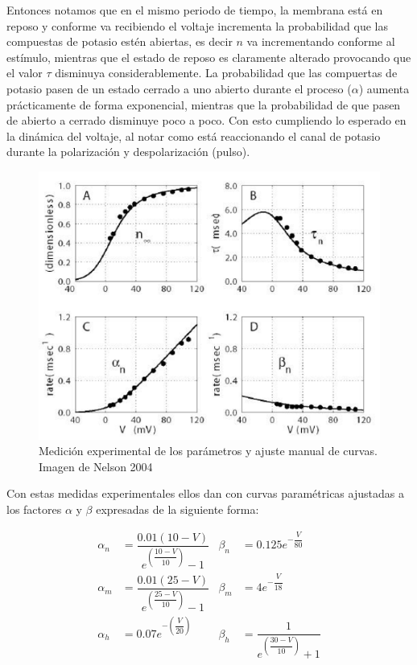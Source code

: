 Entonces notamos que en el mismo periodo de tiempo, la membrana está en reposo y conforme va recibiendo el voltaje incrementa la probabilidad que las compuestas de potasio estén abiertas, es decir \(n\) va incrementando conforme al estímulo, mientras que el estado de reposo es claramente alterado provocando que el valor \(\tau\) disminuya considerablemente. La probabilidad que las compuertas de potasio pasen de un estado cerrado a uno abierto durante el proceso (\(\alpha\)) aumenta prácticamente de forma exponencial, mientras que la probabilidad de que pasen de abierto a cerrado disminuye poco a poco. Con esto cumpliendo lo esperado en la dinámica del voltaje, al notar como está reaccionando el canal de potasio durante la polarización y despolarización (pulso). 



\begin{figure}[h]
 \centering
 \includegraphics[scale=0.5]{../Figuras/medidasExperimentales.png}
 \caption{Medición experimental de los parámetros y ajuste manual de curvas. Imagen de Nelson 2004}
 \label{fig:voltajeAB}
\end{figure}

Con estas medidas experimentales ellos dan con curvas paramétricas ajustadas a los factores \(\alpha\) y \(\beta\) expresadas de la siguiente forma:

\begin{align*}
\alpha_{n}&=\dfrac{0.01(10-V)}{e^{\left(\dfrac{10-V}{10}\right)}-1}           &  \beta_{n}&=0.125e^{-\dfrac{V}{80}}\\
\alpha_{m}&=\dfrac{0.01(25-V)}{e^{\left(\dfrac{25-V}{10}\right)}-1}                    &  \beta_{m}&=4e^{-\dfrac{V}{18}}\\
\alpha_{h}&=0.07 e^{-\left(\dfrac{V}{20}\right)}              &  \beta_{h}&=\dfrac{1}{e^{\left(\dfrac{30-V}{10}\right)}+1}
\label{eq:curvas}
\end{align*}


